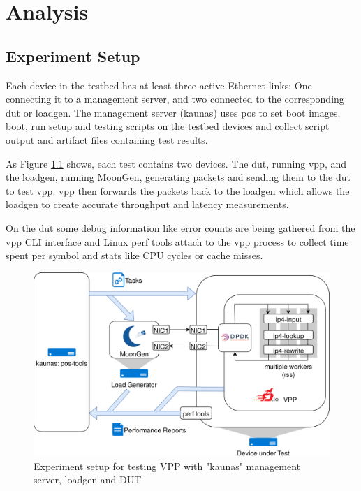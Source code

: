 
\chapter{Analysis}


\section{Experiment Setup}

Each device in the testbed has at least three active Ethernet links:
One connecting it to a management server, and two connected to the
corresponding \Ac{dut} or \Ac{loadgen}. The management server (kaunas)
uses \Ac{pos} \cite{GallScho18} to set boot images, boot, run setup
and testing scripts on the testbed devices and collect script output
and artifact files containing test results.

As Figure \ref{setup} shows, each test contains two devices. The
\Ac{dut}, running \Ac{vpp}, and the \Ac{loadgen}, running MoonGen,
generating packets and sending them to the \Ac{dut} to test \Ac{vpp}.
\Ac{vpp} then forwards the packets back to the \Ac{loadgen} which
allows the \Ac{loadgen} to create accurate throughput and latency
measurements.

On the \Ac{dut} some debug information like error counts are being
gathered from the \Ac{vpp} CLI interface and Linux perf tools
\cite{perf} attach to the \Ac{vpp} process to collect time spent per
symbol and stats like CPU cycles or cache misses.

\begin{figure}[!ht]
\noindent\hspace{0.5mm}\includegraphics[width=\linewidth]{pics/topology.png}
\caption{Experiment setup for testing VPP with "kaunas" management server, \Ac{loadgen} and DUT}
\label{setup}
\end{figure}


